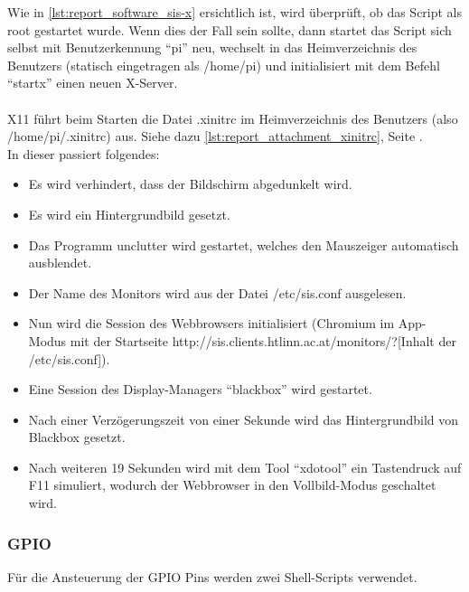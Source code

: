 Wie in \autoref{lst:report_software_sis-x} ersichtlich ist, wird überprüft, ob das Script als root gestartet wurde. Wenn dies der Fall sein sollte, dann startet das Script sich selbst mit Benutzerkennung \enquote{pi} neu, wechselt in das Heimverzeichnis des Benutzers (statisch eingetragen als /home/pi) und initialisiert mit dem Befehl \enquote{startx} einen neuen X-Server.\\
\\
X11 führt beim Starten die Datei .xinitrc im Heimverzeichnis des Benutzers (also /home/pi/.xinitrc) aus. Siehe dazu \autoref{lst:report_attachment_xinitrc}, Seite \pageref{lst:report_attachment_xinitrc}.\\
In dieser passiert folgendes:
\begin{itemize}
	\item Es wird verhindert, dass der Bildschirm abgedunkelt wird.
	\item Es wird ein Hintergrundbild gesetzt.
	\item Das Programm unclutter wird gestartet, welches den Mauszeiger automatisch ausblendet.
	\item Der Name des Monitors wird aus der Datei /etc/sis.conf ausgelesen.
	\item Nun wird die Session des Webbrowsers initialisiert (Chromium im App-Modus mit der Startseite http://sis.clients.htlinn.ac.at/monitors/?[Inhalt der /etc/sis.conf]).
	\item Eine Session des Display-Managers \enquote{blackbox} wird gestartet.
	\item Nach einer Verzögerungszeit von einer Sekunde wird das Hintergrundbild von Blackbox gesetzt.
	\item Nach weiteren 19 Sekunden wird mit dem Tool \enquote{xdotool} ein Tastendruck auf F11 simuliert, wodurch der Webbrowser in den Vollbild-Modus geschaltet wird.
\end{itemize}
\subsubsection{GPIO}
Für die Ansteuerung der GPIO Pins werden zwei Shell-Scripts verwendet.





